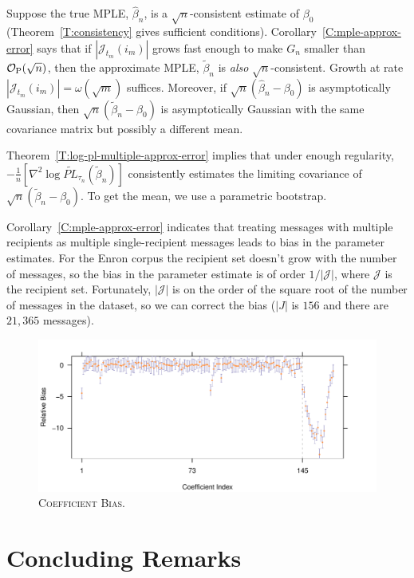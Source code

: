 \documentclass[aoas,preprint]{imsart}
\begin{document}
Suppose the true MPLE, $\hat \beta_n$, is a $\sqrt{n}$-consistent estimate of
$\beta_0$ (Theorem~\ref{T:consistency} gives sufficient conditions).  
Corollary~\ref{C:mple-approx-error} says that if
$|\mathcal{J}_{t_m}(i_m)|$ grows fast enough to make $G_n$ smaller than
$\mathcal{O}_\text{P}(\sqrt{n})$, then the approximate MPLE, $\tilde \beta_n$ is \emph{also}
$\sqrt{n}$-consistent.  Growth at rate
$|\mathcal{J}_{t_m}(i_m)| = \omega(\sqrt{m})$ suffices.
Moreover, if $\sqrt{n}(\hat \beta_n - \beta_0)$ is asymptotically Gaussian, 
then $\sqrt{n}(\tilde \beta_n - \beta_0)$ is asymptotically Gaussian with
the same covariance matrix but possibly a different mean.

Theorem~\ref{T:log-pl-multiple-approx-error} implies that under enough
regularity,
\(
    -\tfrac{1}{n} [
        \nabla^2 \log \widetilde{\mathit{PL}}_{\tau_n}(\tilde \beta_n)
    ]
\)
consistently estimates the limiting covariance
of $\sqrt{n}(\tilde \beta_n - \beta_0)$.  To get the mean, we use
a parametric bootstrap.



Corollary~\ref{C:mple-approx-error} indicates that treating messages with multiple
recipients as multiple single-recipient messages leads to bias in the parameter
estimates.  For the Enron corpus the recipient set doesn't grow with the number
of messages, so the bias in the parameter estimate is of order
$1/|\mathcal{J}|$, where $\mathcal{J}$ is the recipient set.  Fortunately,
$|\mathcal{J}|$ is on the order of the square root of the number of messages
in the dataset, so we can correct the bias ($|J|$ is $156$ and there are $21,365$
messages).

\begin{figure}
    \includegraphics[scale=0.6]{figures/coef-bias}
    \caption{
        \textsc{Coefficient Bias.}
    }
    \label{F:coef-bias}
\end{figure}


\section{Concluding Remarks}
\end{document}
